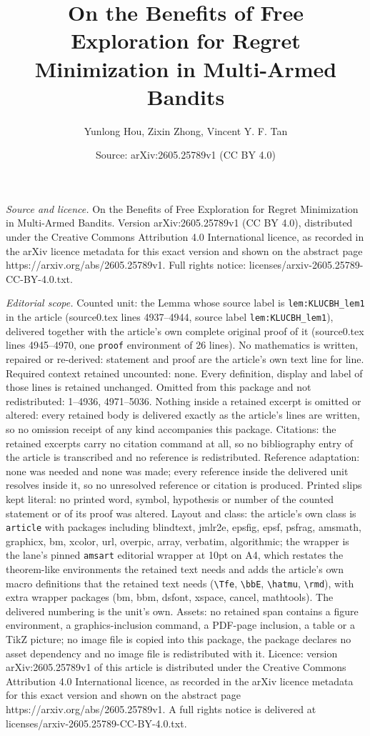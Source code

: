 \documentclass[10pt,a4paper]{amsart}
\title[On the Benefits of Free Exploration for Regret Minimization ]{On the Benefits of Free Exploration for Regret Minimization in Multi-Armed Bandits}
\author{Yunlong Hou, Zixin Zhong, Vincent Y. F. Tan}
\date{Source: arXiv:2605.25789v1 (CC BY 4.0)}
\begin{document}
\maketitle

\noindent\emph{Source and licence.} On the Benefits of Free Exploration for Regret Minimization in Multi-Armed Bandits. Version arXiv:2605.25789v1 (CC BY 4.0), distributed under the Creative Commons Attribution 4.0 International licence, as recorded in the arXiv licence metadata for this exact version and shown on the abstract page https://arxiv.org/abs/2605.25789v1. Full rights notice: licenses/arxiv-2605.25789-CC-BY-4.0.txt.\par\smallskip

\noindent\textit{Editorial scope.} Counted unit: the Lemma whose source label is \texttt{lem:KLUCBH\_lem1} in the article (source0.tex lines 4937--4944, source label \texttt{lem:KLUCBH\_lem1}), delivered together with the article's own complete original proof of it (source0.tex lines 4945--4970, one \texttt{proof} environment of 26 lines). No mathematics is written, repaired or re-derived: statement and proof are the article's own text line for line. Required context retained uncounted: none. Every definition, display and label of those lines is retained unchanged. Omitted from this package and not redistributed: 1--4936, 4971--5036. Nothing inside a retained excerpt is omitted or altered: every retained body is delivered exactly as the article's lines are written, so no omission receipt of any kind accompanies this package. Citations: the retained excerpts carry no citation command at all, so no bibliography entry of the article is transcribed and no reference is redistributed. Reference adaptation: none was needed and none was made; every reference inside the delivered unit resolves inside it, so no unresolved reference or citation is produced. Printed slips kept literal: no printed word, symbol, hypothesis or number of the counted statement or of its proof was altered. Layout and class: the article's own class is \texttt{article} with packages including blindtext, jmlr2e, epsfig, epsf, psfrag, amsmath, graphicx, bm, xcolor, url, overpic, array, verbatim, algorithmic; the wrapper is the lane's pinned \texttt{amsart} editorial wrapper at 10pt on A4, which restates the theorem-like environments the retained text needs and adds the article's own macro definitions that the retained text needs (\texttt{\textbackslash Tfe}, \texttt{\textbackslash bbE}, \texttt{\textbackslash hatmu}, \texttt{\textbackslash rmd}), with extra wrapper packages (bm, bbm, dsfont, xspace, cancel, mathtools). The delivered numbering is the unit's own. Assets: no retained span contains a figure environment, a graphics-inclusion command, a PDF-page inclusion, a table or a TikZ picture; no image file is copied into this package, the package declares no asset dependency and no image file is redistributed with it. Licence: version arXiv:2605.25789v1 of this article is distributed under the Creative Commons Attribution 4.0 International licence, as recorded in the arXiv licence metadata for this exact version and shown on the abstract page https://arxiv.org/abs/2605.25789v1. A full rights notice is delivered at licenses/arxiv-2605.25789-CC-BY-4.0.txt. 
\end{document}
